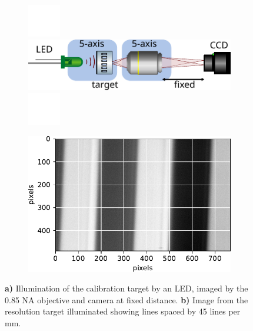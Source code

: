 \begin{figure}
	\begin{subfigure}{.5\textwidth}
	    \flushleft
	    \includegraphics[height=1.44cm]{figures/white.jpeg}
	    \includegraphics[width=\linewidth]{figures/LEDcalibration.pdf}
	    \includegraphics[height=1.44cm]{figures/white.jpeg}
		\caption{}
		\label{fig:SetupResolutionTarget}
	\end{subfigure}
	\hfill
	\begin{subfigure}{.45\textwidth}
	    \flushright
		\includegraphics[width=\linewidth]{figures/LineSpacingCalibration.pdf}
		\caption{}
		\label{fig:3Dwaistfit}
	\end{subfigure}
	\caption{\textbf{a)} Illumination of the calibration target by an LED, imaged by the 0.85 NA objective and camera at fixed distance.
	\textbf{ b)} Image from the resolution target illuminated showing lines spaced by 45 lines per mm.}
	\label{fig:resolutionTarget}
\end{figure}

